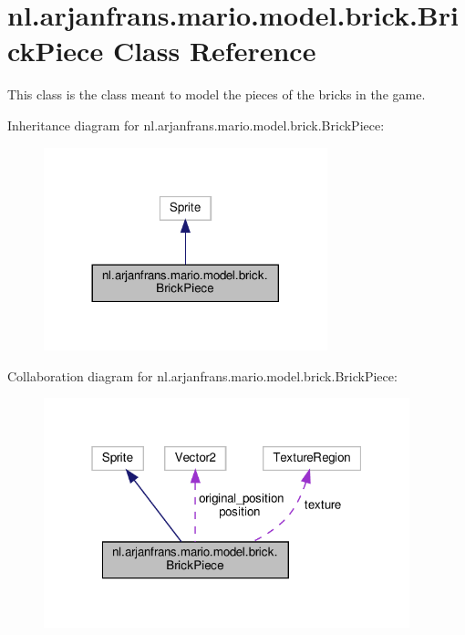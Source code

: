 \hypertarget{classnl_1_1arjanfrans_1_1mario_1_1model_1_1brick_1_1BrickPiece}{}\section{nl.\+arjanfrans.\+mario.\+model.\+brick.\+Brick\+Piece Class Reference}
\label{classnl_1_1arjanfrans_1_1mario_1_1model_1_1brick_1_1BrickPiece}


This class is the class meant to model the pieces of the bricks in the game.  




Inheritance diagram for nl.\+arjanfrans.\+mario.\+model.\+brick.\+Brick\+Piece\+:\nopagebreak
\begin{figure}[H]
\begin{center}
\leavevmode
\includegraphics[width=233pt]{classnl_1_1arjanfrans_1_1mario_1_1model_1_1brick_1_1BrickPiece__inherit__graph}
\end{center}
\end{figure}


Collaboration diagram for nl.\+arjanfrans.\+mario.\+model.\+brick.\+Brick\+Piece\+:\nopagebreak
\begin{figure}[H]
\begin{center}
\leavevmode
\includegraphics[width=301pt]{classnl_1_1arjanfrans_1_1mario_1_1model_1_1brick_1_1BrickPiece__coll__graph}
\end{center}
\end{figure}
